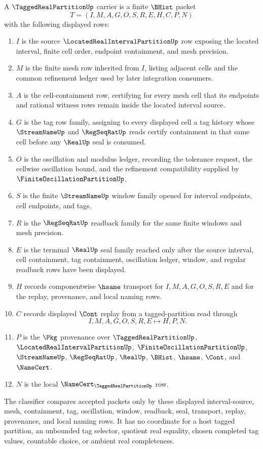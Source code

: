 \begin{definition}
\label{def:tagged-real-partition-carrier}
A $\TaggedRealPartitionUp$ carrier is a finite $\BHist$ packet
$$
T=(I,M,A,G,O,S,R,E,H,C,P,N)
$$
with the following displayed rows:
\begin{enumerate}
\item $I$ is the source $\LocatedRealIntervalPartitionUp$ row exposing the located interval, finite cell order, endpoint containment, and mesh precision.
\item $M$ is the finite mesh row inherited from $I$, listing adjacent cells and the common refinement ledger used by later integration consumers.
\item $A$ is the cell-containment row, certifying for every mesh cell that its endpoints and rational witness rows remain inside the located interval source.
\item $G$ is the tag row family, assigning to every displayed cell a tag history whose $\StreamNameUp$ and $\RegSeqRatUp$ reads certify containment in that same cell before any $\RealUp$ seal is consumed.
\item $O$ is the oscillation and modulus ledger, recording the tolerance request, the cellwise oscillation bound, and the refinement compatibility supplied by $\FiniteOscillationPartitionUp$.
\item $S$ is the finite $\StreamNameUp$ window family opened for interval endpoints, cell endpoints, and tags.
\item $R$ is the $\RegSeqRatUp$ readback family for the same finite windows and mesh precision.
\item $E$ is the terminal $\RealUp$ seal family reached only after the source interval, cell containment, tag containment, oscillation ledger, window, and regular readback rows have been displayed.
\item $H$ records componentwise $\hsame$ transport for $I,M,A,G,O,S,R,E$ and for the replay, provenance, and local naming rows.
\item $C$ records displayed $\Cont$ replay from a tagged-partition read through
$$
I,M,A,G,O,S,R,E \longmapsto H,P,N .
$$
\item $P$ is the $\Pkg$ provenance over $\TaggedRealPartitionUp$, $\LocatedRealIntervalPartitionUp$, $\FiniteOscillationPartitionUp$, $\StreamNameUp$, $\RegSeqRatUp$, $\RealUp$, $\BHist$, $\hsame$, $\Cont$, and $\NameCert$.
\item $N$ is the local $\NameCert_{\TaggedRealPartitionUp}$ row.
\end{enumerate}
The classifier compares accepted packets only by these displayed interval-source, mesh, containment, tag, oscillation, window, readback, seal, transport, replay, provenance, and local naming rows. It has no coordinate for a host tagged partition, an unbounded tag selector, quotient real equality, chosen completed tag values, countable choice, or ambient real completeness.
\end{definition}

